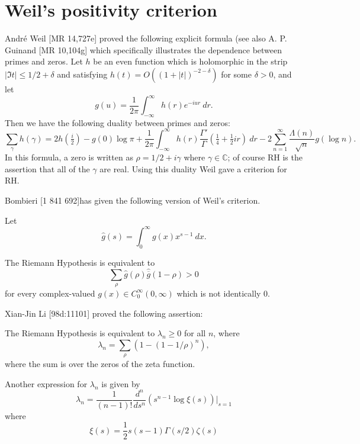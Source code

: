\documentclass[12pt,letterpaper, reqno]{aimpl}
\begin{document}

\section{Weil's positivity criterion}
Andr\'{e} Weil [MR 14,727e] proved the following explicit formula (see also A. P. Guinand [MR 10,104g] which
specifically illustrates the dependence between primes and zeros.
 Let $h$ be an
even function which is holomorphic in the strip $|\Im t|\le
1/2+\delta$ and satisfying $h(t)=O((1+|t|)^{-2-\delta})$ for some
$\delta>0$, and let
$$g(u)=\frac{1}{2\pi}\int_{-\infty}^\infty h(r)e^{-i u r}~dr.$$
Then we have the following duality between primes and zeros:
$$
\sum_{\gamma}h(\gamma)=2h(\tfrac{i}2)  -g(0) \log \pi
+\frac{1}{2\pi} \int_{-\infty}^\infty
h(r)\frac{\Gamma'}{\Gamma}(\tfrac14+\tfrac 12 i
r)~dr-2\sum_{n=1}^\infty \frac{\Lambda(n)}{\sqrt{n}}g(\log n).$$
 In this formula, a zero is written as $\rho=1/2+i\gamma$ where
$\gamma\in \mathbb C$; of course RH is the assertion that all of
the $\gamma$ are real. Using this duality Weil gave a criterion for RH.

\begin{problemblock}
Bombieri [1 841 692]has given the following version of Weil's criterion.

Let
$$
\hat{g}(s)=\int_0^\infty g(x)x^{s-1}~dx.
$$

\begin{rhequivalence}[5.1]The Riemann Hypothesis is
equivalent to
$$\sum_{\rho}\hat{g}(\rho) \hat{\overline{g}}(1-\rho)>0$$
for every complex-valued $g(x)\in C_0^\infty(0,\infty)$
which is not identically 0.
\end{rhequivalence}
\end{problemblock}

\begin{problemblock}
 Xian-Jin Li [98d:11101] proved the following assertion:
\begin{rhequivalence}[5.2]The Riemann Hypothesis is
equivalent to
$\lambda_n\ge 0$ for all $n$, where
$$
\lambda_n =\sum_\rho (1-(1-1/\rho)^n),
$$
where the sum is over the zeros of the zeta function.
\end{rhequivalence}

Another expression for $\lambda_n$ is given by
$$
\lambda_n=\frac{1}{(n-1)!}\frac{d^n}{ds^n}(s^{n-1}\log \xi(s))\vert_{s=1}
$$
where
$$
\xi(s)=\frac12s(s-1)\Gamma(s/2)\zeta(s)
$$
\end{problemblock}
\end{document}
